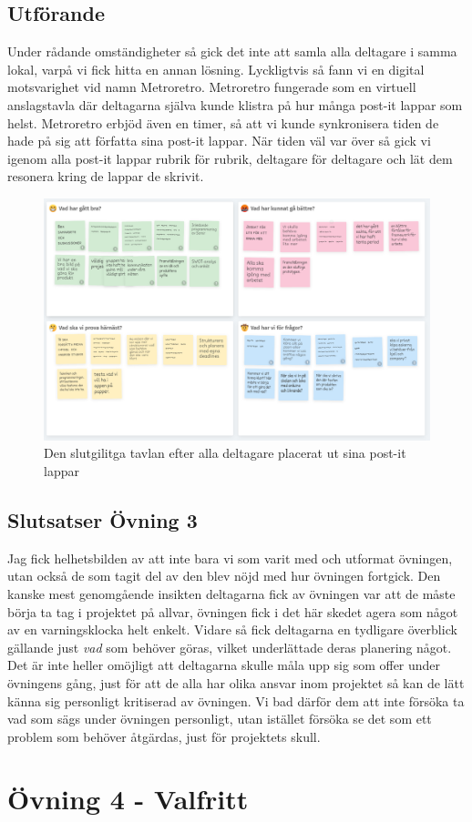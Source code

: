 \documentclass[a4paper, titlepage,12pt]{article}
\begin{document}
			\subsection{Utförande}
				
				Under rådande omständigheter så gick det inte att samla alla deltagare i samma lokal, varpå vi fick hitta en annan lösning. Lyckligtvis så fann vi en digital motsvarighet vid namn Metroretro. Metroretro fungerade som en virtuell anslagstavla där deltagarna själva kunde klistra på hur många post-it lappar som helst. Metroretro erbjöd även en timer, så att vi kunde synkronisera tiden de hade på sig att författa sina post-it lappar. När tiden väl var över så gick vi igenom alla post-it lappar rubrik för rubrik, deltagare för deltagare och lät dem resonera kring de lappar de skrivit.

				\begin{figure}[h!]
					\includegraphics[scale=0.3]{./metroretro-1.png}
					\caption{Den slutgilitga tavlan efter alla deltagare placerat ut sina post-it lappar}
				\end{figure}

			\subsection{Slutsatser Övning 3}

				Jag fick helhetsbilden av att inte bara vi som varit med och utformat övningen, utan också de som tagit del av den blev nöjd med hur övningen fortgick. Den kanske mest genomgående insikten deltagarna fick av övningen var att de måste börja ta tag i projektet på allvar, övningen fick i det här skedet agera som något av en varningsklocka helt enkelt. Vidare så fick deltagarna en tydligare överblick gällande just \emph{vad} som behöver göras, vilket underlättade deras planering något. Det är inte heller omöjligt att deltagarna skulle måla upp sig som offer under övningens gång, just för att de alla har olika ansvar inom projektet så kan de lätt känna sig personligt kritiserad av övningen. Vi bad därför dem att inte försöka ta vad som sägs under övningen personligt, utan istället försöka se det som ett problem som behöver åtgärdas, just för projektets skull.

	\section{Övning 4 - Valfritt}
\end{document}
